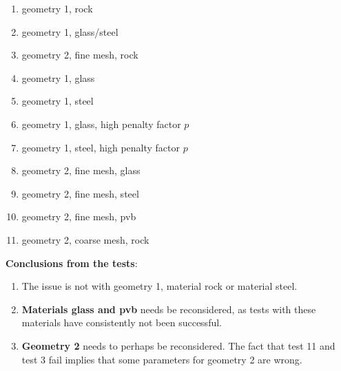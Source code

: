 \begin{enumerate}[topsep=0pt,itemsep=-1ex,partopsep=1ex,parsep=1ex,label= {\color{blue}\textbf{test\arabic*}\,\,}]
    \item geometry 1, rock
    \item geometry 1, glass/steel
    \item geometry 2, fine mesh, rock
    \item geometry 1, glass
    \item geometry 1, steel
    \item geometry 1, glass, high penalty factor $p$
    \item geometry 1, steel, high penalty factor $p$
    \item geometry 2, fine mesh, glass
    \item geometry 2, fine mesh, steel
    \item geometry 2, fine mesh, pvb
    \item geometry 2, coarse mesh, rock
\end{enumerate}

\textbf{Conclusions from the tests}:

\begin{enumerate}[topsep=0pt,itemsep=-1ex,partopsep=1ex,parsep=1ex,label=\Alph*)]
    \item The issue is not with geometry 1, material rock or material steel.
    \item \textbf{Materials glass and pvb} needs be reconsidered, as tests with these materials have consistently not been successful.
    \item \textbf{Geometry 2} needs to perhaps be reconsidered. The fact that test 11 and test 3 fail implies that some parameters for geometry 2 are wrong.
\end{enumerate}

\bigbreak
{\color{blue}\textbf{}}